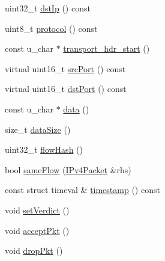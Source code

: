 \begin{DoxyCompactItemize}
uint32\-\_\-t \hyperlink{class_vsid_common_1_1_i_pv4_packet_ac70c0e7771413d5d123d57c263bcde80}{dst\-Ip} () const 
\item 
uint8\-\_\-t \hyperlink{class_vsid_common_1_1_i_pv4_packet_ac1ff979633726d9f558bce1210595879}{protocol} () const 
\item 
const u\-\_\-char $\ast$ \hyperlink{class_vsid_common_1_1_i_pv4_packet_a2318e0a0cc6d297eda5c4eb57682eb09}{transport\-\_\-hdr\-\_\-start} ()
\item 
virtual uint16\-\_\-t \hyperlink{class_vsid_common_1_1_i_pv4_packet_ad7f9c53e8a29a9ab3c87c28278ca7f5c}{src\-Port} () const 
\item 
virtual uint16\-\_\-t \hyperlink{class_vsid_common_1_1_i_pv4_packet_aa61f726412de0c644df127d2cd86ef64}{dst\-Port} () const 
\item 
const u\-\_\-char $\ast$ \hyperlink{class_vsid_common_1_1_i_pv4_packet_a9fb8c763d740e193a68c55604a8a7bd6}{data} ()
\item 
size\-\_\-t \hyperlink{class_vsid_common_1_1_i_pv4_packet_a39fe36210895625ee87320f5c0c7f52e}{data\-Size} ()
\item 
uint32\-\_\-t \hyperlink{class_vsid_common_1_1_i_pv4_packet_a75fde96785c70c7a818a165482eae5e5}{flow\-Hash} ()
\item 
bool \hyperlink{class_vsid_common_1_1_i_pv4_packet_a042efdd301d96b9cf16d9aaea147c234}{same\-Flow} (\hyperlink{class_vsid_common_1_1_i_pv4_packet}{I\-Pv4\-Packet} \&rhs)
\item 
const struct timeval \& \hyperlink{class_vsid_common_1_1_i_pv4_packet_abef9e70b733c8e5718153cb032ea6f1a}{timestamp} () const 
\item 
void \hyperlink{class_vsid_common_1_1_i_pv4_packet_ae314f9e085588928d3c260211f80da87}{set\-Verdict} ()
\item 
void \hyperlink{class_vsid_common_1_1_i_pv4_packet_a091a1ec41077e9a40a13b7a37bb11f0e}{accept\-Pkt} ()
\item 
void \hyperlink{class_vsid_common_1_1_i_pv4_packet_af59fa1adf18f2db27fbe9905de50d5bb}{drop\-Pkt} ()
\end{DoxyCompactItemize}
